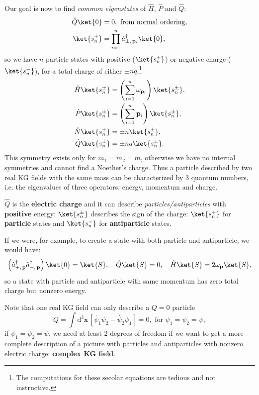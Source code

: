 Our goal is now to find \textit{common eigenstates} of \(\hat{H}\), \(\hat{P}\) and \(\hat{Q}\):
\[
    \begin{aligned}
        \hat{Q} \ket{0} & = 0, \text{ from normal ordering,}                              \\
        \ket{s_n^{\pm}} & = \prod_{i=1}^n \hat{a}_{\pm,\,\mathbf{p}_i}^{\dagger} \ket{0},
    \end{aligned}
\]
so we have \(n\) particle states with positive (\(\ket{s_n^{+}}\)) or negative charge (\(\ket{s_n^{-}}\)), for a total charge of either \(\pm nq\):\footnote{The computations for these secolar equations are tedious and not instructive.}
\[
    \begin{aligned}
        \hat{H} \ket{s_n^{\pm}} & = \left( \sum_{i=1}^n \omega_{\mathbf{p}_i} \right) \ket{s_n^{\pm}}, \\
        \hat{P} \ket{s_n^{\pm}} & = \left( \sum_{i=1}^n \mathbf{p}_i \right) \ket{s_n^{\pm}},          \\
        \hat{N} \ket{s_n^{\pm}} & = \pm n \ket{s_n^{\pm}},                                             \\
        \hat{Q} \ket{s_n^{\pm}} & = \pm nq \ket{s_n^{\pm}}.
    \end{aligned}
\]
This symmetry exists only for \(m_1 = m_2 = m\), otherwise we have no internal symmetries and cannot find a Noether's charge. Thus a particle described by two real KG fields with the same mass can be characterized by 3 quantum numbers, i.e. the eigenvalues of three operators: energy, momentum and charge.

\(\hat{Q}\) is the \textbf{electric charge} and it can describe \textit{particles/antiparticles} with \textbf{positive} energy: \(\ket{s_n^{\pm}}\) describes the sign of the charge: \(\ket{s_n^{+}}\) for \textbf{particle} states and \(\ket{s_n^{-}}\) for \textbf{antiparticle} states.

If we were, for example, to create a state with both particle and antiparticle, we would have:
\[
    \left( \hat{a}^{\dagger}_{+,\,\mathbf{p}} \hat{a}^{\dagger}_{-,\,\mathbf{p}}\right) \ket{0} = \ket{S}, \quad \hat{Q} \ket{S} = 0, \quad \hat{H} \ket{S} = 2 \omega_{\mathbf{p}} \ket{S},
\]
so a state with particle and antiparticle with same momentum has zero total charge but nonzero energy.

Note that one real KG field can only describe a \(Q=0\) particle
\[
    Q = \int \mathrm{d}^3 \mathbf{x} \, [\dot{\psi_1} \psi_2 - \dot{\psi_2} \psi_1] = 0, \text{ for } \psi_1 = \psi_2 = \psi,
\]
if \(\psi_1=\psi_2=\psi\), we need at least 2 degrees of freedom if we want to get a more complete description of a picture with particles and antiparticles with nonzero electric charge: \textbf{complex KG field}.

